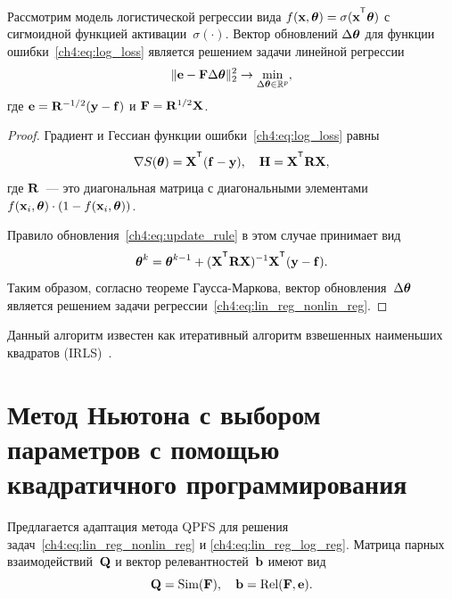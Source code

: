 \begin{theorem}
Рассмотрим модель логистической регрессии вида $f(\bx , \btheta) = \sigma(\bx^{\T} \btheta)$ с сигмоидной функцией активации~$\sigma(\cdot)$. 
Вектор обновлений $\Delta \boldsymbol{\theta}$ для функции ошибки~\eqref{ch4:eq:log_loss} является решением задачи линейной регрессии
\begin{equation}
	\| \mathbf{e} - \mathbf{F} \Delta \boldsymbol{\theta} \|_2^2 \rightarrow \min_{\Delta \boldsymbol{\theta} \in \mathbb{R}^{p}},
	\label{ch4:eq:lin_reg_log_reg}
\end{equation}
где $\mathbf{e} = \mathbf{R}^{-1/2} (\mathbf{y} - \mathbf{f})$ и $\mathbf{F} = \mathbf{R}^{1/2}\mathbf{X}$.
\end{theorem}
\begin{proof}
	Градиент и Гессиан функции ошибки~\eqref{ch4:eq:log_loss} равны
	\begin{equation}
		\nabla S(\btheta) = \bX^{\T} (\mathbf{f} - \by), \quad \bH = \bX^{\T} \bR \bX,
		\label{ch4:eq:log_reg_deriv}
	\end{equation}
	где $\mathbf{R}$~--- это диагональная матрица с диагональными элементами $f(\mathbf{x}_i , \boldsymbol{\theta}) \cdot (1 - f(\mathbf{x}_i , \boldsymbol{\theta}))$.
	
	Правило обновления~\eqref{ch4:eq:update_rule} в этом случае принимает вид
	\[
		\btheta^k = \btheta^{k - 1} + (\bX^{\T} \bR \bX)^{-1} \bX^{\T} (\by - \mathbf{f}).
	\]
	Таким образом, согласно теореме Гаусса-Маркова, вектор обновления~$\Delta \boldsymbol{\theta}$ является решением задачи регрессии~\eqref{ch4:eq:lin_reg_nonlin_reg}.
\end{proof}
Данный алгоритм известен как итеративный алгоритм взвешенных наименьших квадратов (IRLS)~\cite{holland1977robust}. 

\section{Метод Ньютона с выбором параметров с помощью квадратичного программирования}
\label{sec:ch4:newton_qpfs_algorithm}

Предлагается адаптация метода QPFS для решения задач~\eqref{ch4:eq:lin_reg_nonlin_reg} и \eqref{ch4:eq:lin_reg_log_reg}. 
Матрица парных взаимодействий~$\mathbf{Q}$ и вектор релевантностей~$\mathbf{b}$ имеют вид
\[
	\mathbf{Q} = \text{Sim} (\mathbf{F}), \quad \mathbf{b} = \text{Rel} (\mathbf{F}, \mathbf{e}).
\]

